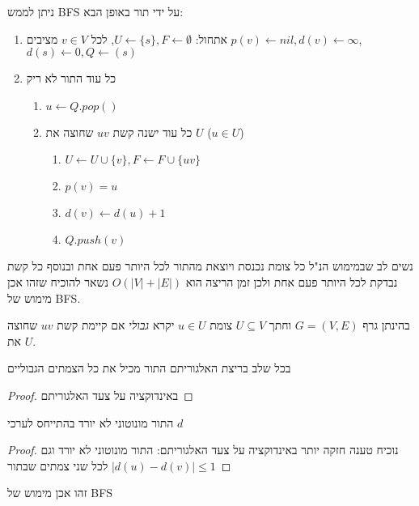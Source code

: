 ניתן לממש BFS על ידי תור באופן הבא:
\begin{enumerate}
\item
אתחול:
$U \leftarrow \{s\}, F \leftarrow \emptyset$, 
לכל 
$v \in V$
מציבים
$p(v) \leftarrow nil, d(v) \leftarrow \infty$,
$d(s) \leftarrow 0, Q \leftarrow (s)$
\item 
כל עוד התור לא ריק 
\begin{enumerate}
	\item
	$u \leftarrow Q.pop()$
\item
כל עוד ישנה קשת 
$uv$
שחוצה את $U$
($u \in U$)
		\begin{enumerate}
		\item
		$U \leftarrow U \cup \{v\}, F \leftarrow F \cup \{uv\}$
		\item
		$p(v) = u$
		\item
		$d(v) \leftarrow d(u) + 1$
		\item
		$Q.push(v)$
		\end{enumerate}
	\end{enumerate}
\end{enumerate}
נשים לב שבמימוש הנ"ל כל צומת נכנסת ויוצאת מהתור לכל היותר פעם אחת 
ובנוסף כל קשת נבדקת לכל היותר פעם אחת ולכן זמן הריצה הוא 
$O(|V| + |E|)$
נשאר להוכיח שזהו אכן מימוש של BFS.

\begin{definition}
בהינתן גרף 
$G = (V,E)$
וחתך 
$U \subseteq V$
צומת 
$u \in U$
יקרא 
\emph{גבולי}
אם קיימת קשת $uv$ שחוצה את $U$.
\end{definition}

\begin{claim}
בכל שלב בריצת האלגוריתם התור מכיל את כל הצמתים הגבוליים
\end{claim}
\begin{proof}
באינדוקציה על צעד האלגוריתם 
\end{proof}

\begin{claim}
התור מונוטוני לא יורד בהתייחס לערכי 
$d$
\end{claim}
\begin{proof}
נוכיח טענה חזקה יותר באינדוקציה על צעד האלגוריתם: 
התור מונוטוני לא יורד וגם 
$|d(u) - d(v)| \leq 1$
לכל שני צמתים שבתור
\end{proof}

\begin{corollary}
זהו אכן מימוש של BFS
\end{corollary}

